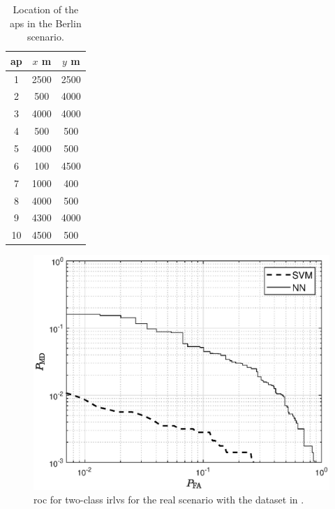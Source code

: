\documentclass[draftcls,onecolumn,12pt]{IEEEtran}
\begin{document}
\begin{table}
\centering
\caption{Location of the \acp{ap} in the Berlin scenario.}
\label{tab:berlin}
\begin{tabular}{c c c}
\toprule
\ac{ap} & $x$ m & $y$ m \\
\midrule
1 & 2500 & 2500 \\
2 & 500 & 4000 \\
3 & 4000 & 4000 \\
4 & 500 & 500 \\
5 & 4000 & 500 \\
6 & 100 & 4500 \\
7 & 1000 & 400 \\
8 & 4000 & 500 \\
9 & 4300 & 4000 \\
10 & 4500 & 500 \\
\bottomrule
\end{tabular}
\end{table}

\begin{figure}[t]
    \centering
    \includegraphics[width=0.6\columnwidth]{berlin.eps}
    \caption{\ac{roc} for two-class \acp{irlv} for the real scenario with the dataset in \cite{MOMENTUM-D53}.}
    \label{fig:Berlin}
\end{figure}

\end{document}
